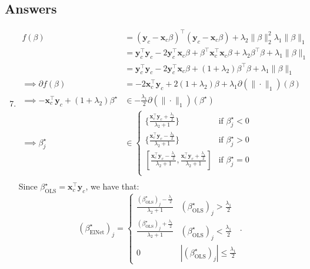 \documentclass{article}
\begin{document}
    \subsection*{Answers}
    \begin{enumerate}
        \setcounter{enumi}{6}

        \item
        \begin{align*}
            f(\beta) &= {(\mathbf{y}_c - \mathbf{x}_c \beta)}^\top {(\mathbf{y}_c - \mathbf{x}_c \beta)} + \lambda_2 \| \beta \|_2^2 \lambda_1 \| \beta \|_1 \\
            &= \mathbf{y}_c^\top \mathbf{y}_c - 2 \mathbf{y}_c^\top \mathbf{x}_c \beta + \beta^\top \mathbf{x}_c^\top \mathbf{x}_c \beta + \lambda_2 \beta^\top \beta + \lambda_1 \| \beta \|_1 \\
            &= \mathbf{y}_c^\top \mathbf{y}_c - 2 \mathbf{y}_c^\top \mathbf{x}_c \beta + (1 + \lambda_2) \beta^\top \beta + \lambda_1 \| \beta \|_1 \\
            \implies \partial f(\beta) &= - 2 \mathbf{x}_c^\top \mathbf{y}_c + 2 (1 + \lambda_2) \beta + \lambda_1 \partial(\| \cdot \|_1)(\beta) \\
            \implies - \mathbf{x}_c^\top \mathbf{y}_c + (1 + \lambda_2) \beta^\star &\in - \frac{\lambda_1}{2} \partial(\| \cdot \|_1)(\beta^\star) \\
            \implies \beta^\star_j &\in \begin{cases}
                \{ \frac{\mathbf{x}_c^\top \mathbf{y}_c + \frac{\lambda_1}{2}}{\lambda_2 + 1} \} & \text{if } \beta^\star_j < 0 \\
                \{ \frac{\mathbf{x}_c^\top \mathbf{y}_c - \frac{\lambda_1}{2}}{\lambda_2 + 1} \} & \text{if } \beta^\star_j > 0 \\
                [ \frac{\mathbf{x}_c^\top \mathbf{y}_c - \frac{\lambda_1}{2}}{\lambda_2 + 1}, \frac{\mathbf{x}_c^\top \mathbf{y}_c + \frac{\lambda_1}{2}}{\lambda_2 + 1}] & \text{if } \beta^\star_j = 0 \\
            \end{cases} \\
        \end{align*}
        Since $\beta^\star_\text{OLS} = \mathbf{x}_c^\top \mathbf{y}_c$, we have that:
        \[
            {(\beta^\star_{\text{ElNet}})}_j = \begin{cases}
                \frac{{(\beta^\star_{\text{OLS}})}_j - \frac{\lambda_1}{2}}{\lambda_2 + 1} & {(\beta^\star_{\text{OLS}})}_j > \frac{\lambda_1}{2} \\ 
                \frac{{(\beta^\star_{\text{OLS}})}_j + \frac{\lambda_1}{2}}{\lambda_2 + 1} & {(\beta^\star_{\text{OLS}})}_j < \frac{\lambda_1}{2} \\ 
                0 & |{(\beta^\star_{\text{OLS}})}_j| \leq \frac{\lambda_1}{2}
            \end{cases}.
        \]
    \end{enumerate}
\end{document}
